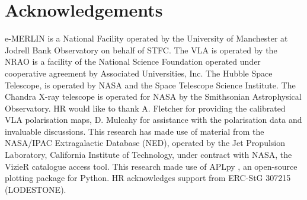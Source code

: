 \documentclass[fleqn,usenatbib]{mnras}
\begin{document}
\section*{Acknowledgements}

e-MERLIN is a National Facility operated by the University of Manchester at Jodrell Bank Observatory on behalf of STFC. The VLA is operated by the NRAO is a facility of the National Science Foundation operated under cooperative agreement by Associated Universities, Inc. The Hubble Space Telescope, is operated by NASA and the Space Telescope Science Institute. The Chandra X-ray telescope is operated for NASA by the Smithsonian Astrophysical Observatory. HR would like to thank A. Fletcher for providing the calibrated VLA polarisation maps, D. Mulcahy for assistance with the polarisation data and invaluable discussions. This research has made use of material from the NASA/IPAC Extragalactic Database (NED), operated by the Jet Propulsion Laboratory, California Institute of Technology, under contract with NASA, the VizieR catalogue access tool. This research made use of APLpy \citep{RB2012}, an open-source plotting package for Python. HR acknowledges support from ERC-StG 307215 (LODESTONE).


\small


 
\end{document}
